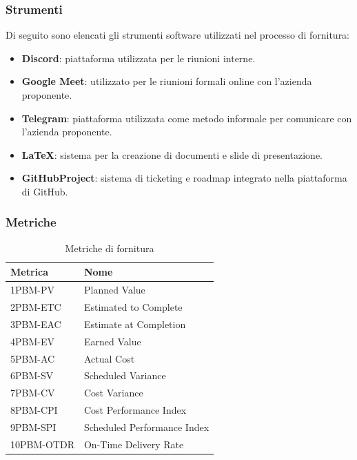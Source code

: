 \subsubsection{Strumenti}
Di seguito sono elencati gli strumenti software utilizzati nel processo di fornitura:
\begin{itemize}
    \item \textbf{Discord}: piattaforma utilizzata per le riunioni interne.
    \item \textbf{Google Meet}: utilizzato per le riunioni formali online con l'azienda proponente.
    \item \textbf{Telegram}: piattaforma utilizzata come metodo informale per comunicare con l'azienda proponente.
    \item \textbf{LaTeX}: sistema per la creazione di documenti e slide di presentazione.
    \item \textbf{GitHubProject}: sistema di ticketing e roadmap integrato nella piattaforma di GitHub. 
\end{itemize}

\subsubsection{Metriche}
\begin{table}[h!]
    \centering
    \renewcommand{\arraystretch}{1.5}
    \begin{tabular}{|m{5cm}|m{5cm}|}
        \hline
        \textbf{Metrica} & \textbf{Nome} \\ \hline
        1PBM-PV         & Planned Value \\ \hline
        2PBM-ETC        & Estimated to Complete \\ \hline
        3PBM-EAC        & Estimate at Completion \\ \hline
        4PBM-EV         & Earned Value \\ \hline
        5PBM-AC         & Actual Cost \\ \hline
        6PBM-SV         & Scheduled Variance \\ \hline
        7PBM-CV         & Cost Variance \\ \hline
        8PBM-CPI        & Cost Performance Index \\ \hline
        9PBM-SPI        & Scheduled Performance Index \\ \hline
        10PBM-OTDR      & On-Time Delivery Rate \\ \hline
    \end{tabular}
    \caption{Metriche di fornitura}
    \label{tab:metriche}
\end{table}







